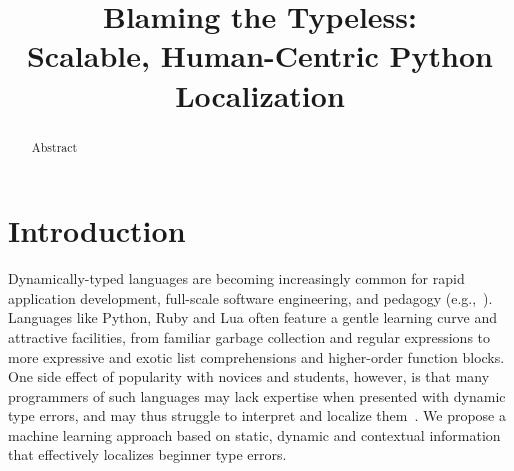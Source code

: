 \documentclass[conference]{IEEEtran}
\begin{document}
%
\title{Blaming the Typeless: \\ Scalable, Human-Centric Python Localization}

\iffalse

\author{\IEEEauthorblockN{Benjamin Cosman}
\IEEEauthorblockA{\textit{UC San Diego}\\
blcosman@eng.ecsd.edu}
\and
\IEEEauthorblockN{Leon Medvinsky}
\IEEEauthorblockA{\textit{UC San Diego}\\
lmedvinsky@eng.ecsd.edu}
\and
\IEEEauthorblockN{Ranjit Jhala}
\IEEEauthorblockA{\textit{UC San Diego}\\
jhala@cs.ecsd.edu}
\and
\IEEEauthorblockN{Westley Weimer}
\IEEEauthorblockA{\textit{University of Michigan}\\
weimerw@umich.edu}
}

\fi

\author{}

\maketitle

\begin{abstract}
Abstract
\end{abstract}

\section{Introduction}

Dynamically-typed languages are becoming increasingly common for rapid
application development, full-scale software engineering, and
pedagogy (e.g.,~\cite{FIXME,FIXME}). Languages like Python, Ruby and Lua
often feature a gentle learning curve and attractive facilities, from
familiar garbage collection and regular expressions to more expressive and
exotic list comprehensions and higher-order function blocks. One side
effect of popularity with novices and students, however, is that many
programmers of such languages may lack expertise when presented with
dynamic type errors, and may thus struggle to interpret and localize
them~\cite{orso-parnin,Zhang2014-lv,Christiansen2014-qc,Pavlinovic2014-mr,Chen2014-gd,Neubauer2003-xv,Stuckey2004-ne}.
We propose a machine learning approach based on static, dynamic and
contextual information that effectively localizes beginner type errors.
\end{document}
